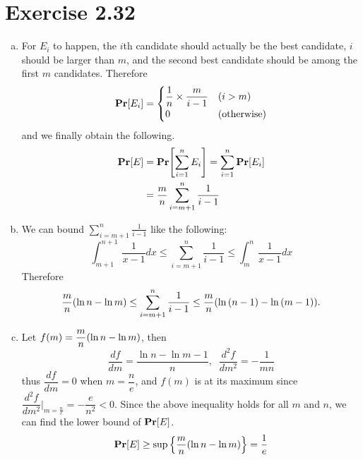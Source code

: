 \documentclass{article}
\begin{document}
\section*{Exercise 2.32}
\begin{enumerate}[(a)]
  \item For $E_i$ to happen, the $i$th candidate should actually be the best candidate, $i$ should be larger than $m$, and the second best candidate should be among the first $m$ candidates.
  Therefore
  $$\mathbf{Pr}\qty[E_i] = \begin{cases}
    \dfrac{1}{n} \times \dfrac{m}{i-1} & (i > m) \\
    0 & (\text{otherwise})
  \end{cases}$$
  and we finally obtain the following.
  \begin{align*}
    \mathbf{Pr}\qty[E] &= \mathbf{Pr}\qty[\sum_{i=1}^{n}E_i] = \sum_{i=1}^{n}\mathbf{Pr}\qty[E_i] \\
    &= \frac{m}{n}\sum_{i = m+1}^{n}\frac{1}{i-1}
  \end{align*}
  \item We can bound $\sum_{i = m+1}^{n}\frac{1}{i-1}$ like the following:
  $$\int_{m+1}^{n+1}\frac{1}{x-1}dx \leq \sum_{i = m+1}^{n}\frac{1}{i-1} \leq \int_{m}^{n}\frac{1}{x-1}dx$$
  Therefore 
  $$\frac{m}{n}\qty(\ln{n}-\ln{m}) \leq \sum_{i = m+1}^{n}\frac{1}{i-1} \leq \frac{m}{n}\qty(\ln\qty(n-1)-\ln\qty(m-1)).$$
  \item Let $f(m) = \dfrac{m}{n}\qty(\ln{n}-\ln{m})$, then
  $$\frac{df}{dm} = \frac{\ln{n} - \ln{m} - 1}{n}, \;\; \frac{d^2f}{dm^2} = -\frac{1}{mn}$$
  thus $\dfrac{df}{dm} = 0$ when $m = \dfrac{n}{e}$, and $f(m)$ is at its maximum since $\dfrac{d^2f}{dm^2}\biggr\rvert_{m=\frac{n}{e}} = -\dfrac{e}{n^2} < 0$.
  Since the above inequality holds for all $m$ and $n$, we can find the lower bound of $\mathbf{Pr}\qty[E]$.
  $$\mathbf{Pr}\qty[E] \geq \sup\qty{\frac{m}{n}\qty(\ln{n}-\ln{m})} = \frac{1}{e}$$
\end{enumerate}
\end{document}
